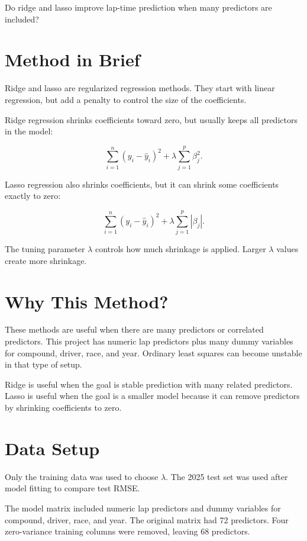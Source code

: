 \documentclass[11pt,oneside,openany]{book}
\begin{document}
Do ridge and lasso improve lap-time prediction when many predictors are included?

\section{Method in Brief}

Ridge and lasso are regularized regression methods. They start with linear regression, but add a penalty to control the size of the coefficients.

Ridge regression shrinks coefficients toward zero, but usually keeps all predictors in the model:

\[
\sum_{i=1}^{n}(y_i-\hat{y}_i)^2 + \lambda \sum_{j=1}^{p}\beta_j^2.
\]

Lasso regression also shrinks coefficients, but it can shrink some coefficients exactly to zero:

\[
\sum_{i=1}^{n}(y_i-\hat{y}_i)^2 + \lambda \sum_{j=1}^{p}|\beta_j|.
\]

The tuning parameter \(\lambda\) controls how much shrinkage is applied. Larger \(\lambda\) values create more shrinkage.

\section{Why This Method?}

These methods are useful when there are many predictors or correlated predictors. This project has numeric lap predictors plus many dummy variables for compound, driver, race, and year. Ordinary least squares can become unstable in that type of setup.

Ridge is useful when the goal is stable prediction with many related predictors. Lasso is useful when the goal is a smaller model because it can remove predictors by shrinking coefficients to zero.

\section{Data Setup}

Only the training data was used to choose \(\lambda\). The 2025 test set was used after model fitting to compare test RMSE.

The model matrix included numeric lap predictors and dummy variables for compound, driver, race, and year. The original matrix had 72 predictors. Four zero-variance training columns were removed, leaving 68 predictors.
\end{document}
